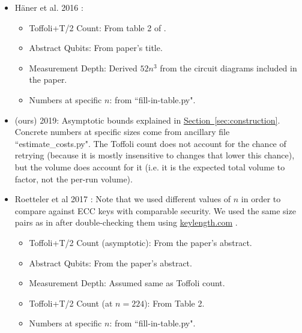 \documentclass[superscriptaddress,notitlepage,longbibliography]{revtex4-1}
\theoremstyle{definition}
\theoremstyle{definition}
\renewcommand{\sec}[1]{\hyperref[sec:#1]{Section~\ref*{sec:#1}}}
\begin{document}
\begin{itemize}
\begin{itemize}
    \end{itemize}
    \item H\"{a}ner et al. 2016 \cite{haner2016factoring}:
    \begin{itemize}
        \item Toffoli+T/2 Count:
            From table 2 of \cite{roetteler2017quantum}.
        \item Abstract Qubits:
            From paper's title.
        \item Measurement Depth:
            Derived $52n^3$ from the circuit diagrams included in the paper.
        \item Numbers at specific $n$: from ``fill-in-table.py".
    \end{itemize}
    \item (ours) 2019:
        Asymptotic bounds explained in \sec{construction}.
        Concrete numbers at specific sizes come from ancillary file ``estimate\_costs.py".
        The Toffoli count does not account for the chance of retrying (because it is mostly insensitive to changes that lower this chance), but the volume does account for it (i.e. it is the expected total volume to factor, not the per-run volume).
    \item Roetteler et al 2017 \cite{roetteler2017quantum}:
        Note that we used different values of $n$ in order to compare against ECC keys with comparable security.
        We used the same size pairs as in \cite{roetteler2017quantum} after double-checking them using \href{https://www.keylength.com/}{keylength.com} \cite{keylength2019}.
        \begin{itemize}
            \item Toffoli+T/2 Count (asymptotic):
                From the paper's abstract.
            \item Abstract Qubits:
                From the paper's abstract.
            \item Measurement Depth:
                Assumed same as Toffoli count.
            \item Toffoli+T/2 Count (at $n=224$):
                From Table 2.
            \item Numbers at specific $n$: from ``fill-in-table.py".
        \end{itemize}
\end{itemize}
\end{document}
